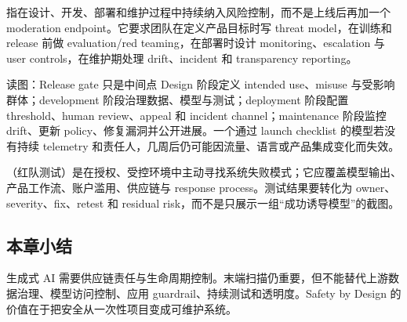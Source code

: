  指在设计、开发、部署和维护过程中持续纳入风险控制，而不是上线后再加一个 moderation endpoint。它要求团队在定义产品目标时写 threat model，在训练和 release 前做 evaluation/red teaming，在部署时设计 monitoring、escalation 与 user controls，在维护期处理 drift、incident 和 transparency reporting。


\begin{knowledgebox}{读图：Release gate 只是中间点}
Design 阶段定义 intended use、misuse 与受影响群体；development 阶段治理数据、模型与测试；deployment 阶段配置 threshold、human review、appeal 和 incident channel；maintenance 阶段监控 drift、更新 policy、修复漏洞并公开进展。一个通过 launch checklist 的模型若没有持续 telemetry 和责任人，几周后仍可能因流量、语言或产品集成变化而失效。
\end{knowledgebox}

（红队测试）是在授权、受控环境中主动寻找系统失败模式；它应覆盖模型输出、产品工作流、账户滥用、供应链与 response process。测试结果要转化为 owner、severity、fix、retest 和 residual risk，而不是只展示一组“成功诱导模型”的截图。


\subsection{本章小结}

生成式 AI 需要供应链责任与生命周期控制。末端扫描仍重要，但不能替代上游数据治理、模型访问控制、应用 guardrail、持续测试和透明度。Safety by Design 的价值在于把安全从一次性项目变成可维护系统。

